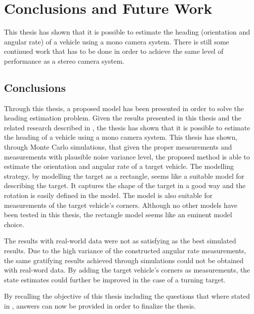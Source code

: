 \chapter{Conclusions and Future Work}
\label{cha:conclusions}

This thesis has shown that it is possible to estimate the heading (orientation and angular rate) of a vehicle using a mono camera system.
There is still some continued work that has to be done in order to achieve the same level of performance as a stereo camera system.

\section{Conclusions}
Through this thesis, a proposed model has been presented in order to solve the heading estimation problem.
Given the results presented in this thesis and the related research described in , the thesis has shown that it is possible to estimate the heading of a vehicle using a mono camera system.
This thesis has shown, through Monte Carlo simulations, that given the proper measurements and measurements with plausible noise variance level, the proposed method is able to estimate the orientation and angular rate of a target vehicle.
The modelling strategy, by modelling the target as a rectangle, seems like a suitable model for describing the target.
It captures the shape of the target in a good way and the rotation is easily defined in the model.
The model is also suitable for measurements of the target vehicle's corners.
Although no other models have been tested in this thesis, the rectangle model seems like an eminent model choice.

The results with real-world data were not as satisfying as the best simulated results.
Due to the high variance of the constructed angular rate measurements, the same gratifying results achieved through simulations could not be obtained with real-word data.
By adding the target vehicle's corners as measurements, the state estimates could further be improved in the case of a turning target.

\newpage

By recalling the objective of this thesis including the questions that where stated in , answers can now be provided in order to finalize the thesis.

